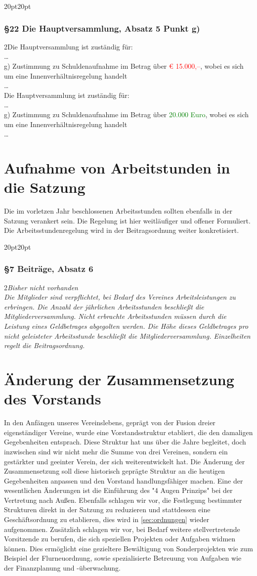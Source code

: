 \documentclass[10pt,a4paper,parskip=half]{scrartcl}
\newcommand{\new}[1]{\textcolor{Green}{#1}}
\newcommand{\old}[1]{\textcolor{Red}{#1}}
\newcommand{\change}[1]{
  \begin{adjustwidth}{20pt}{20pt}
    #1
  \end{adjustwidth}
}
\newcommand{\compare}[3]{\change{\subsubsection*{#1}\begin{multicols}{2}#2\columnbreak\\#3\end{multicols}}}
\begin{document}
\compare{§22 Die Hauptversammlung, Absatz 5 Punkt g)}
{Die Hauptversammlung ist zuständig für: \\ \dots\\g) Zustimmung zu Schuldenaufnahme im Betrag über \old{€ 15.000,--}, wobei es sich um eine Innenverhältnisregelung handelt\\\dots}
{Die Hauptversammlung ist zuständig für: \\ \dots\\g) Zustimmung zu Schuldenaufnahme im Betrag über \new{20.000 Euro}, wobei es sich um eine Innenverhältnisregelung handelt\\\dots}

\clearpage


\section{Aufnahme von Arbeitstunden in die Satzung}
\label{sec:arbeitsstunden}

Die im vorletzen Jahr beschlossenen Arbeitsstunden sollten ebenfalls in der Satzung verankert sein. Die Regelung ist hier weitläufiger und offener Formuliert. Die Arbeitsstundenregelung wird in der Beitragsordnung weiter konkretisiert.

\compare{§7 Beiträge, Absatz 6}
{\em Bisher nicht vorhanden\em}
{
Die Mitglieder sind verpflichtet, bei Bedarf des Vereines Arbeitsleistungen zu erbringen.
Die Anzahl der jährlichen Arbeitsstunden beschließt die Mitgliederversammlung.
Nicht erbrachte Arbeitsstunden müssen durch die Leistung eines Geldbetrages abgegolten werden.
Die Höhe dieses Geldbetrages pro nicht geleisteter Arbeitsstunde beschließt die Mitgliederversammlung.
Einzelheiten regelt die Beitragsordnung.
}

\clearpage

\section{Änderung der Zusammensetzung des Vorstands}
\label{sec:vorstand}
In den Anfängen unseres Vereinslebens, geprägt von der Fusion dreier eigenständiger Vereine, wurde eine Vorstandsstruktur etabliert, die den damaligen Gegebenheiten entsprach. Diese Struktur hat uns über die Jahre begleitet, doch inzwischen sind wir nicht mehr die Summe von drei Vereinen, sondern ein gestärkter und geeinter Verein, der sich weiterentwickelt hat.
Die Änderung der Zusammensetzung soll diese historisch geprägte Struktur an die heutigen Gegebenheiten anpassen und den Vorstand handlungsfähiger machen. Eine der wesentlichen Änderungen ist die Einführung des "4 Augen Prinzips" bei der Vertretung nach Außen. Ebenfalls schlagen wir vor, die Festlegung bestimmter Strukturen direkt in der Satzung zu reduzieren und stattdessen eine Geschäftsordnung zu etablieren, dies wird in \autoref{sec:ordnungen} wieder aufgenommen. Zusätzlich schlagen wir vor, bei Bedarf weitere stellvertretende Vorsitzende zu berufen, die sich speziellen Projekten oder Aufgaben widmen können. Dies ermöglicht eine gezieltere Bewältigung von Sonderprojekten wie zum Beispiel der Flurneuordnung, sowie spezialisierte Betreuung von Aufgaben wie der Finanzplanung und -überwachung.
\end{document}
